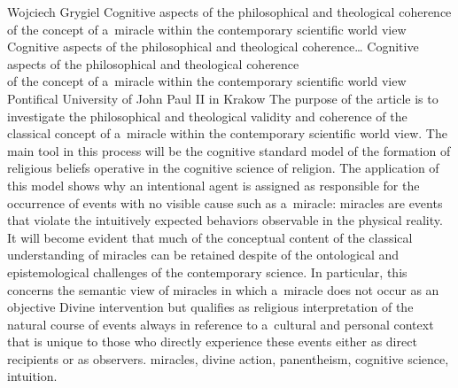 \begin{artengenv}{Wojciech Grygiel}
	{Cognitive aspects of the philosophical and theological coherence of the concept of a~miracle within the contemporary scientific world view}
	{Cognitive aspects of the philosophical and theological coherence\ldots}
	{Cognitive aspects of the philosophical and theological coherence\\of the concept of a~miracle within the contemporary scientific world view}
	{Pontifical University of John Paul II in Krakow}
	{The purpose of the article is to investigate the philosophical and theological validity and coherence of the classical concept of a~miracle within the contemporary scientific world view. The main tool in this process will be the cognitive standard model of the formation of religious beliefs operative in the cognitive science of religion. The application of %
	this model shows why an intentional agent is assigned as responsible for the occurrence of events with no visible cause such as a~miracle: miracles are events that violate the intuitively expected behaviors observable in the physical reality. It will become evident that much of the conceptual content of the classical understanding of miracles can be retained despite of the ontological and epistemological challenges of the contemporary science. In particular, this concerns the semantic view of miracles in which a~miracle does not occur as an objective Divine intervention but qualifies as religious interpretation of the natural course of events always in reference to a~cultural and personal context that is unique to those who directly experience these events either as direct recipients or as observers.}
	{miracles, divine action, panentheism, cognitive science, intuition.}
	
	




\end{artengenv}
